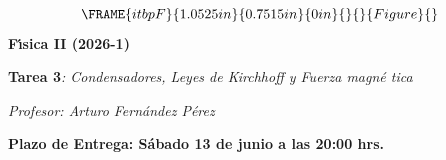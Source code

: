 \documentclass[onecolumn]{article}
\begin{document}
\begin{center}
\begin{equation*}
\FRAME{itbpF}{1.0525in}{0.7515in}{0in}{}{}{Figure}{\special{language
"Scientific Word";type "GRAPHIC";maintain-aspect-ratio TRUE;display
"USEDEF";valid_file "T";width 1.0525in;height 0.7515in;depth
0in;original-width 2.3168in;original-height 1.6466in;cropleft "0";croptop
"1";cropright "1";cropbottom "0";tempfilename
'TCTQIQ04.bmp';tempfile-properties "XPR";}}
\end{equation*}%
\textbf{F\'{\i}sica II (2026-1)}

\textbf{Tarea 3}\emph{: Condensadores, Leyes de Kirchhoff y Fuerza magn\'{e}%
tica}

\textit{Profesor: Arturo Fern\'{a}ndez P\'{e}rez}

\textbf{Plazo de Entrega: S\'{a}bado 13 de junio a las 20:00 hrs.}
\end{center}
\end{document}
